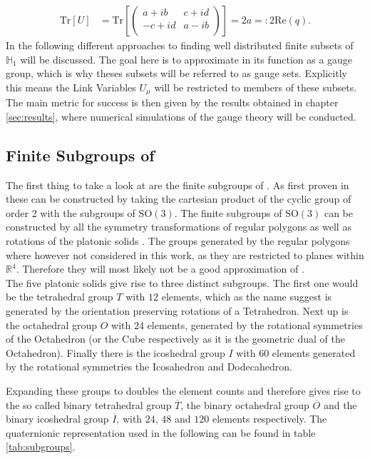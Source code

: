 \begin{align*}
 \mathrm{Tr}\left[ U \right] & = \mathrm{Tr}\left[ \begin{pmatrix}
   a + ib  & c + id \\
   -c + id & a - ib \\
  \end{pmatrix} \right] = 2 a = : 2 \mathrm{Re} (q) \textrm{.}
\end{align*}
In the following different approaches to finding well distributed finite subsets of $\mathbb{H}_1$ will be discussed. The goal here is to approximate \SUTwo in its function as a gauge group, which is why theses subsets will be referred to as gauge sets. Explicitly this means the Link Variables $U_\mu$ will be restricted to members of these subsets. The main metric for success is then given by the results obtained in chapter \ref{sec:results}, where numerical simulations of the gauge theory will be conducted.

\subsection{Finite Subgroups of \SUTwo}

The first thing to take a look at are the finite subgroups of \SUTwo. As first proven in \cite{findsource} these can be constructed by taking the cartesian product of the cyclic group of order 2 with the subgroups of $\mathrm{SO}(3)$. The finite subgroups of $\mathrm{SO}(3)$ can be constructed by all the symmetry transformations of regular polygons as well as rotations of the platonic solids \cite{Klein:1880}. The groups generated by the regular polygons where however not considered in this work, as they are restricted to planes within $\mathbb{R}^4$. Therefore they will most likely not be a good approximation of \SUTwo.\\

The five platonic solids give rise to three distinct subgroups. The first one would be the tetrahedral group $T$ with $12$ elements, which as the name suggest is generated by the orientation preserving rotations of a Tetrahedron. Next up is the octahedral group $O$ with $24$ elements, generated by the rotational symmetries of the Octahedron (or the Cube respectively as it is the geometric dual of the Octahedron). Finally there is the icoshedral group $I$ with $60$ elements generated by the rotational symmetries the Icosahedron and Dodecahedron.

Expanding these groups to \SUTwo doubles the element counts and therefore gives rise to the so called binary tetrahedral group $\overline{T}$, the binary octahedral group $\overline{O}$ and the binary icoshedral group $\overline{I}$, with $24$, $48$ and $120$ elements respectively. The quaternionic representation used in the following can be found in table \ref{tab:subgroups}.

